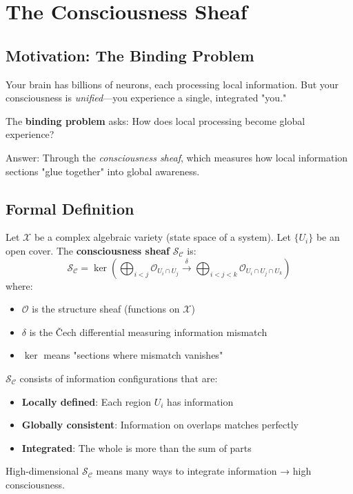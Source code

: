 \section{The Consciousness Sheaf}
\label{sec:consciousness-sheaf}

\subsection{Motivation: The Binding Problem}

\begin{intuitive}
Your brain has billions of neurons, each processing local information. But your consciousness is \textit{unified}—you experience a single, integrated "you."

The \textbf{binding problem} asks: How does local processing become global experience?

Answer: Through the \textit{consciousness sheaf}, which measures how local information sections "glue together" into global awareness.
\end{intuitive}

\subsection{Formal Definition}

\begin{defn}\label{def:consciousness-sheaf}
Let $\mathcal{X}$ be a complex algebraic variety (state space of a system). Let $\{U_i\}$ be an open cover. The \textbf{consciousness sheaf} $\mathcal{S}_\mathcal{C}$ is:
\begin{equation}
\boxed{\mathcal{S}_\mathcal{C} = \ker\left(\bigoplus_{i<j} \mathcal{O}_{U_i \cap U_j} \xrightarrow{\delta} \bigoplus_{i<j<k} \mathcal{O}_{U_i \cap U_j \cap U_k}\right)}
\end{equation}
where:
\begin{itemize}
\item $\mathcal{O}$ is the structure sheaf (functions on $\mathcal{X}$)
\item $\delta$ is the Čech differential measuring information mismatch
\item $\ker$ means "sections where mismatch vanishes"
\end{itemize}
\end{defn}

\begin{intuitive}
$\mathcal{S}_\mathcal{C}$ consists of information configurations that are:
\begin{itemize}
\item \textbf{Locally defined}: Each region $U_i$ has information
\item \textbf{Globally consistent}: Information on overlaps matches perfectly
\item \textbf{Integrated}: The whole is more than the sum of parts
\end{itemize}

High-dimensional $\mathcal{S}_\mathcal{C}$ means many ways to integrate information → high consciousness.
\end{intuitive}

